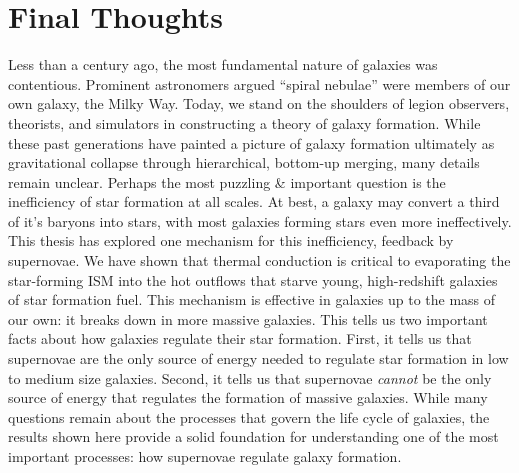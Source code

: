 \section{Final Thoughts}
Less than a century ago, the most fundamental nature of galaxies was
contentious.  Prominent astronomers argued ``spiral nebulae'' were members of
our own galaxy, the Milky Way.  Today, we stand on the shoulders of legion
observers, theorists, and simulators in constructing a theory of galaxy
formation.  While these past generations have painted a picture of galaxy
formation ultimately as gravitational collapse through hierarchical, bottom-up
merging, many details remain unclear.  Perhaps the most puzzling \& important
question is the inefficiency of star formation at all scales.  At best, a galaxy
may convert a third of it's baryons into stars, with most galaxies forming stars
even more ineffectively.  This thesis has explored one mechanism for this
inefficiency, feedback by supernovae.  We have shown that thermal conduction
is critical to evaporating the star-forming ISM into the hot outflows that starve
young, high-redshift galaxies of star formation fuel.  This mechanism is effective
in galaxies up to the mass of our own: it breaks down in more massive galaxies.
This tells us two important facts about how galaxies regulate their star
formation.  First, it tells us that supernovae are the only source of energy
needed to regulate star formation in low to medium size galaxies.  Second, it
tells us that supernovae {\it cannot} be the only source of energy that
regulates the formation of massive galaxies.  While many questions remain about
the processes that govern the life cycle of galaxies, the results shown here
provide a solid foundation for understanding one of the most important processes:
how supernovae regulate galaxy formation.



